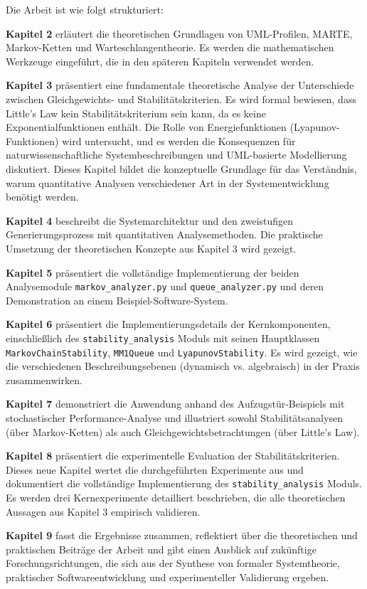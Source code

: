 ﻿\documentclass[a4paper,12pt]{report}
\theoremstyle{definition}
\begin{document}
Die Arbeit ist wie folgt strukturiert:

\textbf{Kapitel 2} erläutert die theoretischen Grundlagen von UML-Profilen, MARTE, Markov-Ketten und Warteschlangentheorie. Es werden die mathematischen Werkzeuge eingeführt, die in den späteren Kapiteln verwendet werden.

\textbf{Kapitel 3} präsentiert eine fundamentale theoretische Analyse der Unterschiede zwischen Gleichgewichts- und Stabilitätskriterien. Es wird formal bewiesen, dass Little's Law kein Stabilitätskriterium sein kann, da es keine Exponentialfunktionen enthält. Die Rolle von Energiefunktionen (Lyapunov-Funktionen) wird untersucht, und es werden die Konsequenzen für naturwissenschaftliche Systembeschreibungen und UML-basierte Modellierung diskutiert. Dieses Kapitel bildet die konzeptuelle Grundlage für das Verständnis, warum quantitative Analysen verschiedener Art in der Systementwicklung benötigt werden.

\textbf{Kapitel 4} beschreibt die Systemarchitektur und den zweistufigen Generierungsprozess mit quantitativen Analysemethoden. Die praktische Umsetzung der theoretischen Konzepte aus Kapitel 3 wird gezeigt.

\textbf{Kapitel 5} präsentiert die vollständige Implementierung der beiden
Analysemodule \texttt{markov\_analyzer.py} und \texttt{queue\_analyzer.py}
und deren Demonstration an einem Beispiel-Software-System.

\textbf{Kapitel 6} präsentiert die Implementierungsdetails der Kernkomponenten, einschließlich des \texttt{stability\_analysis} Moduls mit seinen Hauptklassen \texttt{MarkovChainStability}, \texttt{MM1Queue} und \texttt{LyapunovStability}. Es wird gezeigt, wie die verschiedenen Beschreibungsebenen (dynamisch vs. algebraisch) in der Praxis zusammenwirken.

\textbf{Kapitel 7} demonstriert die Anwendung anhand des Aufzugstür-Beispiels mit stochastischer Performance-Analyse und illustriert sowohl Stabilitätsanalysen (über Markov-Ketten) als auch Gleichgewichtsbetrachtungen (über Little's Law).

\textbf{Kapitel 8} präsentiert die experimentelle Evaluation der Stabilitätskriterien. Dieses neue Kapitel wertet die durchgeführten Experimente aus und dokumentiert die vollständige Implementierung des \texttt{stability\_analysis} Moduls. Es werden drei Kernexperimente detailliert beschrieben, die alle theoretischen Aussagen aus Kapitel 3 empirisch validieren.

\textbf{Kapitel 9} fasst die Ergebnisse zusammen, reflektiert über die theoretischen und praktischen Beiträge der Arbeit und gibt einen Ausblick auf zukünftige Forschungsrichtungen, die sich aus der Synthese von formaler Systemtheorie, praktischer Softwareentwicklung und experimenteller Validierung ergeben.
\end{document}
